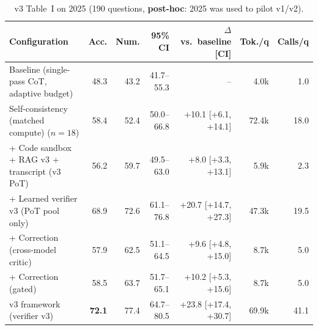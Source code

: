 \begin{table}[!t]
\centering
\footnotesize
\caption{v3 Table~I on 2025 (190 questions, \textbf{post-hoc}: 2025 was used to pilot v1/v2).}
\label{tab:t25}
\setlength{\tabcolsep}{3.5pt}
\begin{tabular}{lrrrrrr}
\toprule
Configuration & Acc. & Num. & 95\% CI & $\Delta$ vs.\ baseline [CI] & Tok./q & Calls/q \\
\midrule
Baseline (single-pass CoT, adaptive budget) & 48.3 & 43.2 & 41.7--55.3 & -- & 4.0k & 1.0 \\
Self-consistency (matched compute) ($n{=}18$) & 58.4 & 52.4 & 50.0--66.8 & +10.1 [+6.1, +14.1] & 72.4k & 18.0 \\
+ Code sandbox + RAG v3 + transcript (v3 PoT) & 56.2 & 59.7 & 49.5--63.0 & +8.0 [+3.3, +13.1] & 5.9k & 2.3 \\
+ Learned verifier v3 (PoT pool only) & 68.9 & 72.6 & 61.1--76.8 & +20.7 [+14.7, +27.3] & 47.3k & 19.5 \\
+ Correction (cross-model critic) & 57.9 & 62.5 & 51.1--64.5 & +9.6 [+4.8, +15.0] & 8.7k & 5.0 \\
+ Correction (gated) & 58.5 & 63.7 & 51.7--65.1 & +10.2 [+5.3, +15.6] & 8.7k & 5.0 \\
v3 framework (verifier v3) & \textbf{72.1} & 77.4 & 64.7--80.5 & +23.8 [+17.4, +30.7] & 69.9k & 41.1 \\
\bottomrule
\end{tabular}
\end{table}
